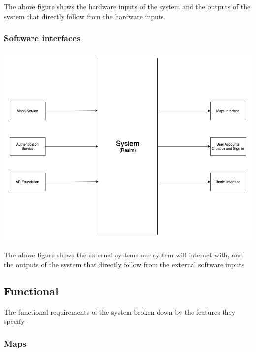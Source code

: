 \documentclass{article}
\begin{document}
The above figure shows the hardware inputs of the system and the outputs of the system that directly follow from the hardware inputs.


\subsubsection{Software interfaces}

\begin{center}
    \includegraphics[scale=0.4]{OtherDiagrams/sscd.png}
\end{center}

The above figure shows the external systems our system will interact with, and the outputs of the system that directly follow from the external software inputs

\subsection{Functional}
\label{sub:functional}

The functional requirements of the system broken down by the features they specify

\subsubsection{Maps}
\label{ssub:maps}
\end{document}
